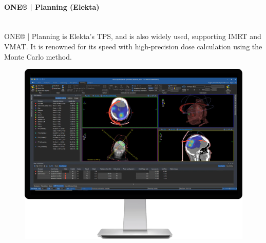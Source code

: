 \Needspace{7cm}
\begin{multicols}{2}
	\paragraph{ONE® | Planning (Elekta)}
	\ \\
	ONE® | Planning \cite{one_planning} is Elekta's TPS, and is also widely used, supporting IMRT and VMAT.
	It is renowned for its speed with high-precision dose calculation using the Monte Carlo method.
	
	\columnbreak
	
	\begin{figure}[H]
		\centering
		\includegraphics[width=\linewidth]{OnePlanningElekta.png}
		\label{peudofig:screenshot_one_planning}
	\end{figure}
\end{multicols}

